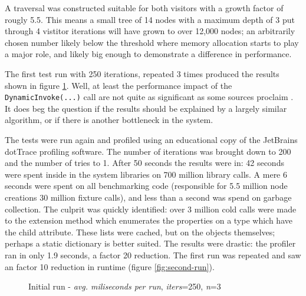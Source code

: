\documentclass[twoside,openright]{uva-bachelor-thesis}
\newcommand{\code}[1]{\texttt{\footnotesize#1}}
\begin{document}
			A traversal was constructed suitable for both visitors with a growth factor of rougly 5.5. This means a small tree of 14 nodes with a maximum depth of 3 put through 4 vistitor iterations will have grown to over 12,000 nodes; an arbitrarily chosen number likely below the threshold where memory allocation starts to play a major role, and likely big enough to demonstrate a difference in performance.
			
			The first test run with 250 iterations, repeated 3 times produced the results shown in figure \ref{fig:first-run}. Well, at least the performance impact of the \code{DynamicInvoke(...)} call are not quite as significant as some sources proclaim \cite{website:msdn-reflection}. It does beg the question if the results should be explained by a largely similar algorithm, or if there is another bottleneck in the system.
			
			The tests were run again and profiled using an educational copy of the JetBrains dotTrace profiling software. The number of iterations was brought down to 200 and the number of tries to 1. After 50 seconds the results were in: 42 seconds were spent inside in the system libraries on 700 million library calls. A mere 6 seconds were spent on all benchmarking code (responsible for 5.5 million node creations 30 million fixture calls), and less than a second was spend on garbage collection. The culprit was quickly identified: over 3 million cold calls were made to the extension method which enumerates the properties on a type which have the child attribute. These lists were cached, but on the objects themselves; perhaps a static dictionary is better suited. The results were drastic: the profiler ran in only 1.9 seconds, a factor 20 reduction. The first run was repeated and saw an factor 10 reduction in runtime (figure \ref{fig:second-run}).
												
			\begin{figure}
				\centering
				\caption{Initial run - \emph{avg. miliseconds per run}, \emph{iters}=250, \emph{n}=3}
				\label{fig:first-run}
			\end{figure}
			
\end{document}
